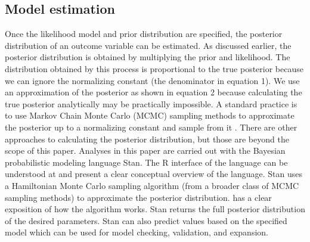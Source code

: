 \documentclass{article}
\begin{document}
\subsection*{Model estimation}
Once the likelihood model and prior distribution are specified, the posterior distribution of an outcome variable can be estimated. As discussed earlier, the posterior distribution is obtained by multiplying the prior and likelihood. The distribution obtained by this process is proportional to the true posterior because we can ignore the normalizing constant (the denominator in equation 1). We use an approximation of the posterior as shown in equation 2 because calculating the true posterior analytically may be practically impossible.  A standard practice is to use Markov Chain Monte Carlo (MCMC) sampling methods to approximate the posterior up to a normalizing constant and sample from it \cite{gelman2014bayesian}. There are  other approaches to calculating the posterior distribution, but those are beyond the scope of this paper. Analyses in this paper are carried out with the Bayesian probabilistic modeling language Stan. The R interface of the language can be understood at  and  present a clear conceptual overview of the language. Stan uses a Hamiltonian Monte Carlo sampling algorithm (from a broader class of MCMC sampling methods) to approximate the posterior distribution.  has a clear exposition of how the algorithm works. Stan returns the full posterior distribution of the desired parameters. Stan can also predict values based on the specified model which can be used for model checking, validation, and expansion.
\end{document}
